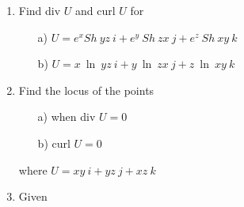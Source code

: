 \documentclass[11pt]{amsbook}
\begin{document}
\begin{enumerate}
\begin{multicols}{2}
\begin{enumerate}
				$f(x,y)=e^{x}\cos{y}$
			\item[b)]
				$f(x,y)=e^{x}\sin{y}$
					\footnote{In the original scanned document there is no equals sign but it looks like that it should have been}
		\end{enumerate}
	\end{multicols}
     \item
	Find div $U$ and curl $U$ for
	\begin{enumerate}
		\item[a)]
			$U=e^{x} Sh~yz~i
				+e^{y}~Sh~zx~j
				+e^{z}~Sh~xy~k$
		\item[b)]
			$U=x~\ln ~yz~i
				+y~\ln ~zx~j
				+z~\ln~xy~k$
	\end{enumerate}
     \item
	Find the locus of the points
	\begin{multicols}{2}
		\begin{enumerate}
			\item[a)]
				when div $U=0$
			\item[b)]
				curl $U=0$
		\end{enumerate}
	\end{multicols}
	where $U=xy~i
			+yz~j
			+xz~k$
    \item
	Given
\end{enumerate}
\end{document}
